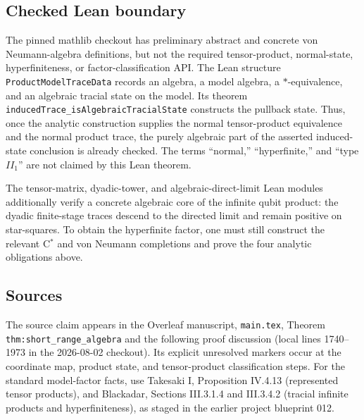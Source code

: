 \documentclass{article}
\begin{document}
\subsection*{Checked Lean boundary}

The pinned mathlib checkout has preliminary abstract and concrete von
Neumann-algebra definitions, but not the required tensor-product, normal-state,
hyperfiniteness, or factor-classification API.  The Lean structure
\texttt{ProductModelTraceData} records an algebra, a model
algebra, a \(*\)-equivalence, and an algebraic tracial state on the model.  Its
theorem \texttt{inducedTrace\_isAlgebraicTracialState} constructs the pullback
state.  Thus, once the analytic construction supplies the normal
tensor-product equivalence and the normal product trace, the purely algebraic
part of the asserted induced-state conclusion is already checked.  The terms
``normal,'' ``hyperfinite,'' and ``type \(II_1\)'' are not claimed by this Lean
theorem.

The tensor-matrix, dyadic-tower, and algebraic-direct-limit Lean modules
additionally verify a concrete algebraic core of the infinite qubit product:
the dyadic finite-stage traces descend to the directed limit and remain
positive on star-squares.  To obtain the hyperfinite factor, one must still
construct the relevant C\(^*\) and von Neumann completions and prove the four
analytic obligations above.

\subsection*{Sources}

The source claim appears in the Overleaf manuscript, \texttt{main.tex},
Theorem \texttt{thm:short\_range\_algebra} and the following proof discussion
(local lines 1740--1973 in the 2026-08-02 checkout).  Its explicit unresolved
markers occur at the coordinate map, product state, and tensor-product
classification steps.  For the standard model-factor facts, use Takesaki I,
Proposition IV.4.13 (represented tensor products), and Blackadar,
Sections III.3.1.4 and III.3.4.2 (tracial infinite products and
hyperfiniteness), as staged in the earlier project blueprint 012.
\end{document}
